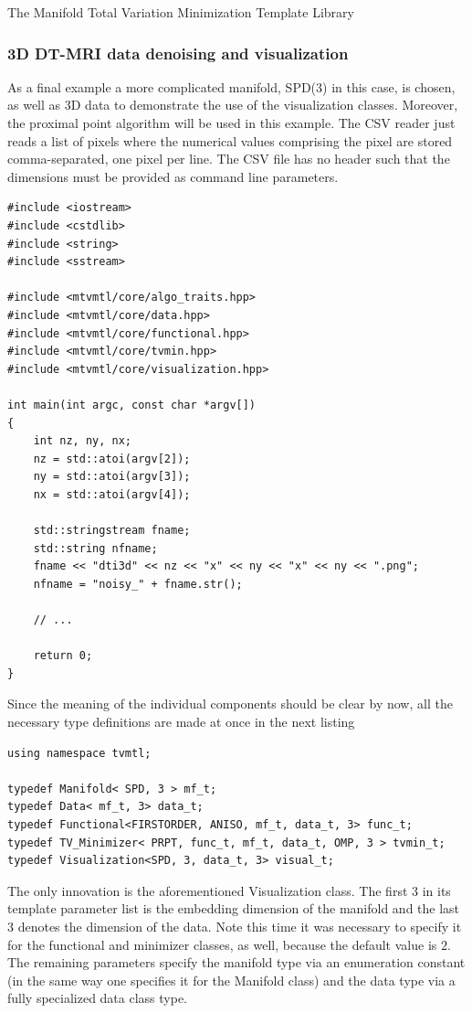 \begin{chapter}{The Manifold Total Variation Minimization Template Library}
\subsubsection{3D DT-MRI data denoising and visualization} %
\label{ssub:dti_tut}
As a final example a more complicated manifold, SPD(3) in this case, is chosen, as well as 3D data to demonstrate the use of the visualization classes. Moreover, the proximal point algorithm will be used in this example. The CSV reader just reads a list of pixels where the numerical values comprising the pixel are stored comma-separated, one pixel
per line. The CSV file has no header such that the dimensions must be provided as command line parameters.

\cppinline
\begin{lstlisting}[label=code:tut3_init,caption={Initialization}]
#include <iostream>
#include <cstdlib>
#include <string>
#include <sstream>

#include <mtvmtl/core/algo_traits.hpp>
#include <mtvmtl/core/data.hpp>
#include <mtvmtl/core/functional.hpp>
#include <mtvmtl/core/tvmin.hpp>
#include <mtvmtl/core/visualization.hpp>

int main(int argc, const char *argv[])
{       
    int nz, ny, nx;
    nz = std::atoi(argv[2]);
    ny = std::atoi(argv[3]);
    nx = std::atoi(argv[4]);

    std::stringstream fname;
    std::string nfname;
    fname << "dti3d" << nz << "x" << ny << "x" << ny << ".png";
    nfname = "noisy_" + fname.str();
    
    // ...

    return 0;    
}
\end{lstlisting}
	
Since the meaning of the individual components should be clear by now, all the necessary type definitions 
are made at once in the next listing\\
\cppinline
\begin{lstlisting}[label=code:tut3_typdefinitions,caption={Type definitions, Visualization type}]
using namespace tvmtl;

typedef Manifold< SPD, 3 > mf_t;
typedef Data< mf_t, 3> data_t;
typedef Functional<FIRSTORDER, ANISO, mf_t, data_t, 3> func_t;
typedef TV_Minimizer< PRPT, func_t, mf_t, data_t, OMP, 3 > tvmin_t;
typedef Visualization<SPD, 3, data_t, 3> visual_t;
\end{lstlisting}

The only innovation is the aforementioned Visualization class. The first $3$ in its template parameter list is the embedding dimension of the manifold 
and the last $3$ denotes the dimension of the data. Note this time it was necessary to specify it for the functional and minimizer classes, as well, because the default value is $2$. 
The remaining parameters specify the manifold type via an enumeration constant (in the same way one specifies it for the Manifold class) and the data type via a fully
specialized data class type.\\


\end{chapter}
